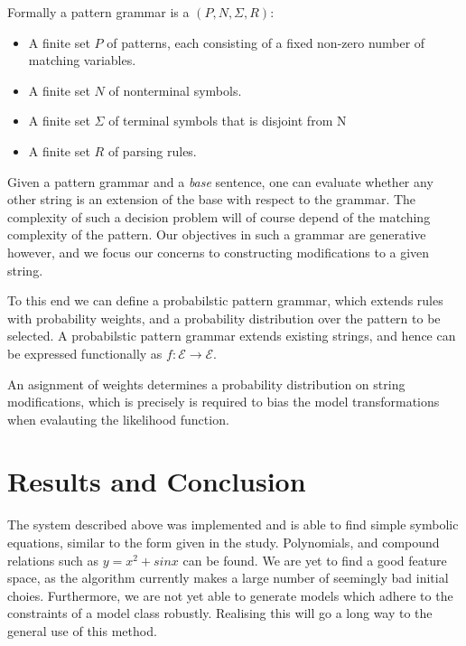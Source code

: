 Formally a pattern grammar is a  $(P, N, \Sigma, R)$:

\begin{itemize}
\item A finite set $P$ of patterns, each consisting of a fixed non-zero number of matching variables. 
\item A finite set $N$ of nonterminal symbols.
\item A finite set $\Sigma$ of terminal symbols that is disjoint from N
\item A finite set $R$ of parsing rules.
\end{itemize}

Given a pattern grammar and a {\em base} sentence, one can evaluate whether any other string is an extension of the base with respect to the grammar.
The complexity of such a decision problem will of course depend of the matching complexity of the pattern.
Our objectives in such a grammar are generative however, and we focus our concerns to constructing modifications to a given string.

To this end we can define a probabilstic pattern grammar, which extends rules with probability weights, and a probability distribution over the pattern to be selected.
A probabilstic pattern grammar extends existing strings, and hence can be expressed functionally as $f:\mathcal{E} \rightarrow \mathcal{E}$.

An asignment of weights determines a probability distribution on string modifications, which is precisely is required to bias the model transformations when evalauting the likelihood function.

\section*{Results and Conclusion}

The system described above was implemented and is able to find simple symbolic equations, similar to the form given in the study.
Polynomials, and compound relations such as $y=x^2+sinx$ can be found.
We are yet to find a good feature space, as the algorithm currently makes a large number of seemingly bad initial choies.
Furthermore, we are not yet able to generate models which adhere to the constraints of a model class robustly.
Realising this will go a long way to the general use of this method.